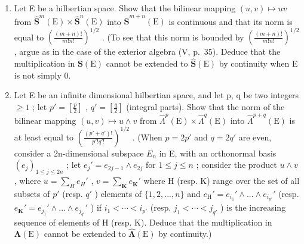 \exercisegroup

\begin{enumerate}
\def\labelenumi{\arabic{enumi})}
\tightlist
\item
  Let E be a hilbertian space. Show that the bilinear mapping \((u, v) \mapsto uv\) from \(\hat{\mathbf{S}}^{m}(\mathrm{E}) \times \hat{\mathbf{S}}^{n}(\mathrm{E})\) into \(\hat{\mathbf{S}}^{m+n}(\mathrm{E})\) is continuous and that its norm is equal to \(\left(\frac{(m+n)!}{m! n!}\right)^{1/2}\) . (To see that this norm is bounded by \(\left(\frac{(m+n)!}{m! n!}\right)^{1/2}\) , argue as in the case of the exterior algebra (V, p.~35). Deduce that the multiplication in \(\mathbf{S}(\mathrm{E})\) cannot be extended to \(\hat{\mathbf{S}}(\mathrm{E})\) by continuity when E is not simply 0.
\item
  Let E be an infinite dimensional hilbertian space, and let p, q be two integers \(\geqslant 1\) ; let \(p' = \left[\frac{p}{2}\right]\) , \(q' = \left[\frac{q}{2}\right]\) (integral parts). Show that the norm of the bilinear mapping \((u, v) \mapsto u \wedge v\) from \(\hat{\Lambda}^{p}(\mathrm{E}) \times \hat{\Lambda}^{q}(\mathrm{E})\) into \(\hat{\Lambda}^{p+q}(\mathrm{E})\) is at least equal to \(\left(\frac{(p' + q')!}{p'! q'!}\right)^{1/2}\) . (When \(p = 2p'\) and \(q = 2q'\) are even, consider a 2n-dimensional subspace \(E_{n}\) in E, with an orthonormal basis \((e_{j})_{1 \leqslant j \leqslant 2n}\) ; let \(e_{j}' = e_{2j-1} \wedge e_{2j}\) for \(1 \leqslant j \leqslant n\) ; consider the product \(u \wedge v\) , where \(u = \sum_{H} e_{H}'\) , \(v = \sum_{\mathbf{K}} e_{\mathbf{K}}'\) where H (resp. K) range over the set of all subsets of \(p'\) (resp. \(q'\) ) elements of \(\{1, 2, ..., n\}\) and \(e_{\mathrm{H}}' = e_{i_1}' \wedge ... \wedge e_{i_{p'}}'\) (resp. \(e_{\mathbf{K}}' = e_{j_1}' \wedge ... \wedge e_{j_{q'}}'\) ) if \(i_1 < \cdots < i_{p'}\) (resp. \(j_1 < \cdots < j_{q'}\) ) is the increasing sequence of elements of H (resp. K). Deduce that the multiplication in \(\boldsymbol{\Lambda}(\mathrm{E})\) cannot be extended to \(\hat{\boldsymbol{\Lambda}}(\mathrm{E})\) by continuity.)
\end{enumerate}
\relax{}
